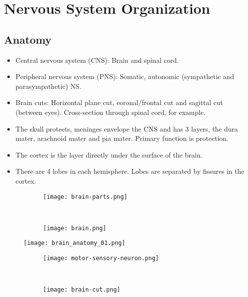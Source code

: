 \documentclass[main]{subfiles}
\begin{document}

\section{Nervous System Organization}
\subsection{Anatomy}
\begin{itemize}[noitemsep,nolistsep]
	\item Central nervous system (CNS): Brain and spinal cord.
	\item Peripheral nervous system (PNS): Somatic, autonomic (sympathetic and parasympathetic) NS.
	\item Brain cuts: Horizontal plane cut, coronal/frontal cut and sagittal cut (between eyes). Cross-section through spinal cord, for example.
	\item The skull protects, meninges envelope the CNS and has 3 layers, the dura mater, arachnoid mater and pia mater. Primary function is protection.
	\item The cortex is the layer directly under the surface of the brain.
	\item There are 4 lobes in each hemisphere. Lobes are separated by fissures in the cortex.
\end{itemize}
\begin{figure}[H]
	\centering
	\begin{subfigure}[b]{0.5\textwidth}
		\centering
		\texttt{[image: brain-parts.png]}
	\end{subfigure}%
	~
	\begin{subfigure}[b]{0.5\textwidth}
		\centering
		\texttt{[image: brain.png]}
	\end{subfigure}
\end{figure}
\begin{figure}[H]
	\centering
	\texttt{[image: brain\_anatomy\_01.png]}
\end{figure}
\begin{figure}[H]
	\centering
	\begin{subfigure}[b]{0.5\textwidth}
		\centering
		\texttt{[image: motor-sensory-neuron.png]}
	\end{subfigure}%
	~
	\begin{subfigure}[b]{0.5\textwidth}
		\centering
		\texttt{[image: brain-cut.png]}
	\end{subfigure}
\end{figure}
\end{document}
